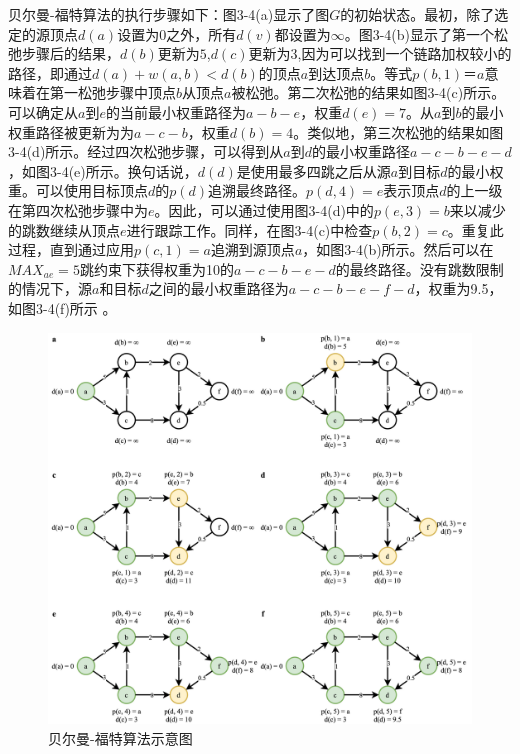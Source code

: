 贝尔曼-福特算法的执行步骤如下：图3-4(a)显示了图$G$的初始状态。最初，除了选定的源顶点$d(a)$设置为$0$之外，所有$d(v)$都设置为$\infty$。图3-4(b)显示了第一个松弛步骤后的结果，$d(b)$更新为$5$,$d(c)$更新为$3$,因为可以找到一个链路加权较小的路径，即通过$d(a)+w(a,b)<d(b)$的顶点$a$到达顶点$b$。等式$p(b,1)＝a$意味着在第一松弛步骤中顶点$b$从顶点$a$被松弛。第二次松弛的结果如图3-4(c)所示。可以确定从$a$到$e$的当前最小权重路径为${a-b-e}$，权重$d(e)=7$。从$a$到$b$的最小权重路径被更新为为${a-c-b}$，权重$d(b)=4$。类似地，第三次松弛的结果如图3-4(d)所示。经过四次松弛步骤，可以得到从$a$到$d$的最小权重路径${a-c-b-e-d}$，如图3-4(e)所示。换句话说，$d(d)$是使用最多四跳之后从源$a$到目标$d$的最小权重。可以使用目标顶点$d$的$p(d)$追溯最终路径。$p(d,4)=e$表示顶点$d$的上一级在第四次松弛步骤中为$e$。因此，可以通过使用图3-4(d)中的$p(e,3)=b$来以减少的跳数继续从顶点$e$进行跟踪工作。同样，在图3-4(c)中检查$p(b,2)=c$。重复此过程，直到通过应用$p(c,1)=a$追溯到源顶点$a$，如图3-4(b)所示。然后可以在${MAX}_{ae}=5$跳约束下获得权重为10的${a-c-b-e-d}$的最终路径。没有跳数限制的情况下，源$a$和目标$d$之间的最小权重路径为${a-c-b-e-f-d}$，权重为9.5，如图3-4(f)所示 \cite{BFOPTI} 。

\begin{figure}[htbp]
\setlength{\abovecaptionskip}{15pt plus 3pt minus 2pt}
\centerline{\includegraphics[width=1\textwidth]{./figures/ch3-bf.png}}
\caption{贝尔曼-福特算法示意图 \cite{SRBANDWIDTH1, BFOPTI}}
\label{fig-ch3-bf}
\end{figure}

